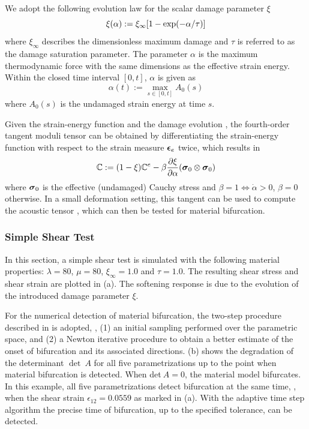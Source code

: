 \documentclass[12pt]{article}
\numberwithin{equation}{section}
\begin{document}
We adopt the following evolution law for the scalar damage parameter $
\xi$ \cite{Holzapfel:2000}
\begin{equation}\label{eq:iso-xi}
  \xi(\alpha) := \xi_{\infty} [ 1- {\rm exp}(-\alpha / \tau)]
\end{equation}
where $\xi_{\infty}$ describes the dimensionless maximum damage and
$\tau$ is referred to as the damage saturation parameter. The
parameter $\alpha$ is the maximum thermodynamic force
\cite{Holzapfel:2000} with the same dimensions as the effective strain
energy. Within the closed time interval $[0,t]$, $\alpha$ is given as
\begin{equation}\label{eq:alpha}
  \alpha(t) := \max_{s\in [0,t]}A_0(s)
\end{equation}
where $A_0(s)$ is the undamaged strain energy at time $s$.

Given the strain-energy function  and the damage
evolution , the fourth-order tangent moduli tensor can
be obtained by differentiating the strain-energy function with respect
to the strain measure ${\boldsymbol{\epsilon}}_e$ twice, which results in
\begin{equation}
  \mathbb{C} := (1-\xi)\mathbb{C}^e
    - \beta \frac{\partial\xi}{\partial\alpha}
    ({\boldsymbol{\sigma}}_0\otimes{\boldsymbol{\sigma}}_0)
\end{equation}
where ${\boldsymbol{\sigma}}_0$ is the effective (undamaged) Cauchy stress and
$\beta = 1 \iff \dot{\alpha} > 0$, $\beta=0$ otherwise. In a small
deformation setting, this tangent can be used to compute the acoustic
tensor , which can then be tested for
material bifurcation.

\subsubsection{Simple Shear Test}

In this section, a simple shear test is simulated with the following
material properties: $\lambda = 80$, $\mu = 80$, $\xi_{\infty} = 1.0$
and $\tau = 1.0$. The resulting shear stress and shear strain are
plotted in (a). The softening response is
due to the evolution of the introduced damage parameter $\xi$.

For the numerical detection of material bifurcation, the two-step
procedure described in  is adopted, \ie, (1) an
initial sampling performed over the parametric space, and (2) a Newton
iterative procedure to obtain a better estimate of the onset of
bifurcation and its associated directions.
(b) shows the degradation of the
determinant $\det~A$ for all five parametrizations up to the point
when material bifurcation is detected. When det$~A = 0$, the material
model bifurcates. In this example, all five parametrizations detect
bifurcation at the same time, \ie, when the shear strain
$\epsilon_{12}=0.0559$ as marked in 
(a). With the adaptive time step algorithm the precise time of
bifurcation, up to the specified tolerance, can be detected.
\end{document}
